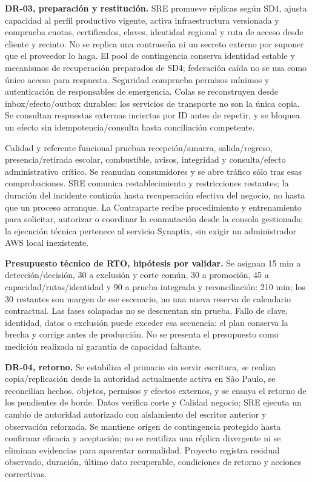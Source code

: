 \textbf{DR-03, preparación y restitución.} SRE promueve réplicas según SD4, ajusta capacidad al perfil productivo vigente, activa infraestructura versionada y comprueba cuotas, certificados, claves, identidad regional y ruta de acceso desde cliente y recinto. No se replica una contraseña ni un secreto externo por suponer que el proveedor lo haga. El pool de contingencia conserva identidad estable y mecanismos de recuperación preparados de SD4; federación caída no se usa como único acceso para respuesta. Seguridad comprueba permisos mínimos y autenticación de responsables de emergencia. Colas se reconstruyen desde inbox/efecto/outbox durables: los servicios de transporte no son la única copia. Se consultan respuestas externas inciertas por ID antes de repetir, y se bloquea un efecto sin idempotencia/consulta hasta conciliación competente.

Calidad y referente funcional prueban recepción/amarra, salida/regreso, presencia/retirada escolar, combustible, avisos, integridad y consulta/efecto administrativo crítico. Se reanudan consumidores y se abre tráfico sólo tras esas comprobaciones. SRE comunica restablecimiento y restricciones restantes; la duración del incidente continúa hasta recuperación efectiva del negocio, no hasta que un proceso arranque. La Contraparte recibe procedimiento y entrenamiento para solicitar, autorizar o coordinar la conmutación desde la consola gestionada; la ejecución técnica pertenece al servicio Synaptix, sin exigir un administrador AWS local inexistente. \parencites[RT-07.01--07; p.~17]{sd8-bt}[numerales 2.4 y 17.6]{sd8-c07}

\textbf{Presupuesto técnico de RTO, hipótesis por validar.} Se asignan 15 min a detección/decisión, 30 a exclusión y corte común, 30 a promoción, 45 a capacidad/rutas/identidad y 90 a prueba integrada y reconciliación: 210 min; los 30 restantes son margen de ese escenario, no una nueva reserva de calendario contractual. Las fases solapadas no se descuentan sin prueba. Fallo de clave, identidad, datos o exclusión puede exceder esa secuencia: el plan conserva la brecha y corrige antes de producción. No se presenta el presupuesto como medición realizada ni garantía de capacidad faltante.

\textbf{DR-04, retorno.} Se estabiliza el primario sin servir escritura, se realiza copia/replicación desde la autoridad actualmente activa en São Paulo, se reconcilian hechos, objetos, permisos y efectos externos, y se ensaya el retorno de los pendientes de borde. Datos verifica corte y Calidad negocio; SRE ejecuta un cambio de autoridad autorizado con aislamiento del escritor anterior y observación reforzada. Se mantiene origen de contingencia protegido hasta confirmar eficacia y aceptación; no se reutiliza una réplica divergente ni se eliminan evidencias para aparentar normalidad. Proyecto registra residual observado, duración, último dato recuperable, condiciones de retorno y acciones correctivas.

